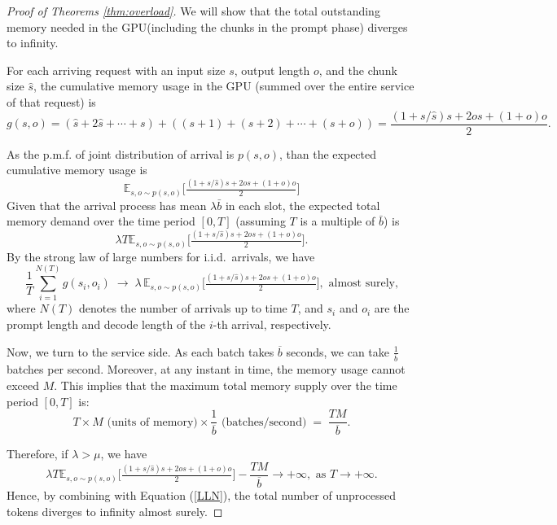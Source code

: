 \documentclass[10pt,a4paper]{amsart}
\begin{document}
\begin{proof}[Proof of Theorems \ref{thm:overload}]
We will show that the total outstanding memory needed in the GPU(including the chunks in the prompt phase) diverges to infinity.

For each arriving request with an input size \(s\), output length \(o\), and the chunk size \(\hat{s}\), the cumulative memory usage in the GPU (summed over the entire service of that request) is
\[
g(s,o)=(\hat{s}+2\hat{s}+\cdots+s)+((s+1)+(s+2)+\cdots+(s+o)) = \frac{(1+s/\hat{s})s+2os+(1+o)o}{2}.
\]

As the p.m.f. of joint distribution of arrival is $p(s,o)$, than the expected cumulative memory usage is 
\[
   \mathbb{E}_{s,o\sim p(s,o)}\Big[\tfrac{(1+s/\hat{s})s+2os+(1+o)o}{2}\Big] 
\]
Given that the arrival process has mean $\lambda \bar b$ in each slot, the expected total memory demand over the time period $[0,T]$ (assuming $T$ is a multiple of $\bar b$) is
\[
   \lambda T\mathbb{E}_{s,o\sim p(s,o)}\Big[\tfrac{(1+s/\hat{s})s+2os+(1+o)o}{2}\Big]. 
\]
By the strong law of large numbers for i.i.d.\ arrivals, we have
\begin{equation}
\frac{1}{T}\sum_{i=1}^{N(T)} g(s_i,o_i)
\;\rightarrow\;
\lambda \,\mathbb{E}_{s,o\sim p(s,o)}
\Big[\tfrac{(1+s/\hat{s})s+2os+(1+o)o}{2}\Big], \text{ almost surely,}
\label{LLN}
\end{equation}
where $N(T)$ denotes the number of arrivals up to time $T$, and
$s_i$ and $o_i$ are the prompt length and decode length of the $i$-th
arrival, respectively.

Now, we turn to the service side. As each batch takes \(\overline{b}\) seconds, we can take \(\tfrac{1}{\overline{b}}\) batches per second.  
Moreover, at any instant in time, the memory usage cannot exceed \(M\). This implies that the maximum total memory supply over the time period $[0,T]$  is:
\[
   T\times M
\text{ (units of memory)} 
   \times
   \frac{1}{\overline{b}}
\text{ (batches/second)}
   \;=\;
   \frac{TM}{\,\overline{b}\,}.
\]

Therefore, if \(\lambda>\mu\), we have 
\[
\lambda T\mathbb{E}_{s,o\sim p(s,o)}\Big[\tfrac{(1+s/\hat{s})s+2os+(1+o)o}{2}\Big] - \frac{TM}{\,\overline{b}\,}\rightarrow +\infty, \text{ as }T \rightarrow +\infty.
\]
Hence, by combining with Equation (\ref{LLN}), the total number of unprocessed tokens diverges to infinity almost surely.

\end{proof}
\end{document}
